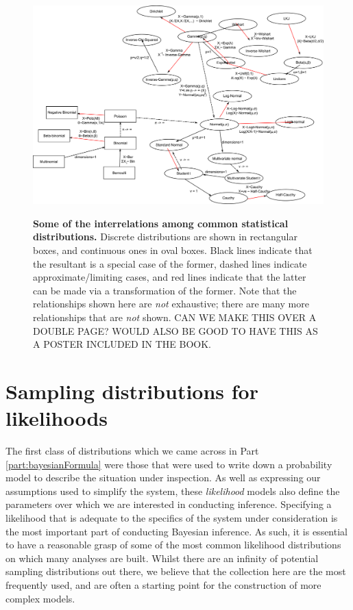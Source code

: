 \documentclass[11pt,fullpage]{book}
\begin{document}
\begin{figure}
\centering
\scalebox{0.12} 
{\includegraphics{Distributions_nexusOfRelations.pdf}}
\caption{\textbf{Some of the interrelations among common statistical distributions.} Discrete distributions are shown in rectangular boxes, and continuous ones in oval boxes. Black lines indicate that the resultant is a special case of the former, dashed lines indicate approximate/limiting cases, and  red lines indicate that the latter can be made via a transformation of the former. Note that the relationships shown here are \textit{not} exhaustive; there are many more relationships that are \textit{not} shown. CAN WE MAKE THIS OVER A DOUBLE PAGE? WOULD ALSO BE GOOD TO HAVE THIS AS A POSTER INCLUDED IN THE BOOK.}\label{fig:Distributions_nexusOfRelations}
\end{figure}

\section{Sampling distributions for likelihoods}\label{sec:Distributions_samplingDist}
The first class of distributions which we came across in Part \ref{part:bayesianFormula} were those that were used to write down a probability model to describe the situation under inspection. As well as expressing our assumptions used to simplify the system, these \textit{likelihood} models also define the parameters over which we are interested in conducting inference. Specifying a likelihood that is adequate to the specifics of the system under consideration is the most important part of conducting Bayesian inference. As such, it is essential to have a reasonable grasp of some of the most common likelihood distributions on which many analyses are built. Whilst there are an infinity of potential sampling distributions out there, we believe that the collection here are the most frequently used, and are often a starting point for the construction of more complex models.
\end{document}

